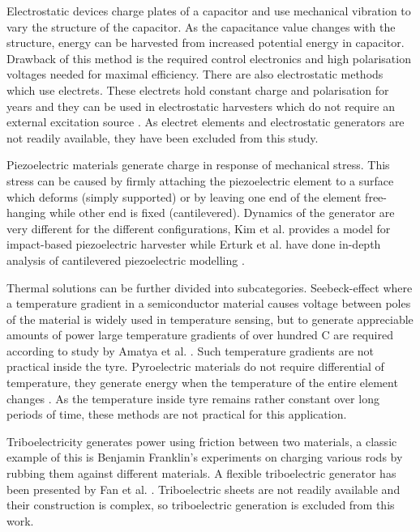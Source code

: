 Electrostatic devices charge plates of a capacitor and use mechanical vibration to vary the structure of the capacitor. As the capacitance value changes with the structure, energy can be harvested from increased potential energy in capacitor. Drawback of this method is the required control electronics and high polarisation voltages needed for maximal efficiency. There are also electrostatic methods which use electrets. These electrets hold constant charge and polarisation for years and they can be used in electrostatic harvesters which do not require an external excitation source \cite{Boisseau2012}. As electret elements and electrostatic generators are not readily available, they have been excluded from this study.

Piezoelectric materials generate charge in response of mechanical stress. This stress can be caused by firmly attaching the piezoelectric element to a surface which deforms (simply supported) or by leaving one end of the element free-hanging while other end is fixed (cantilevered). Dynamics of the generator are very different for the different configurations, Kim et al. \cite{Kim2014a} provides a model for impact-based piezoelectric harvester while Erturk et al. have done in-depth analysis of cantilevered piezoelectric modelling \cite{Erturk2009}. 

Thermal solutions can be further divided into subcategories. Seebeck-effect where a temperature gradient in a semiconductor material causes voltage between poles of the material is widely used in temperature sensing, but to generate appreciable amounts of power large temperature gradients of over hundred \degree C are required according to study by Amatya et al. \cite{Amatya2010}. Such temperature gradients are not practical inside the tyre. Pyroelectric materials do not require differential of temperature, they generate energy when the temperature of the entire element changes \cite{Zhang2011}. As the temperature inside tyre remains rather constant over long periods of time, these methods are not practical for this application.

Triboelectricity generates power using friction between two materials, a classic example of this is Benjamin Franklin's experiments on charging various rods by rubbing them against different materials. A flexible triboelectric generator has been presented by Fan et al. \cite{Fan2012}. Triboelectric sheets are not readily available and their construction is complex, so triboelectric generation is excluded from this work. 

